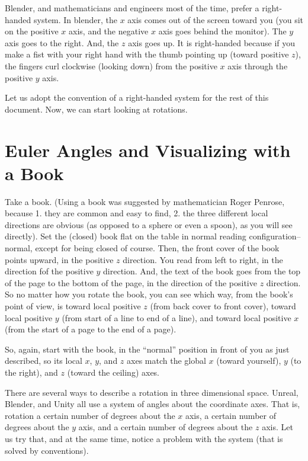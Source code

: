 \documentclass[letter,12pt]{article}
\begin{document}
Blender, and mathematicians and engineers most of the time, prefer a right-handed system.  In blender, the $x$ axis comes out of the screen toward you (you sit on the positive $x$ axis, and the negative $x$ axis goes behind the monitor).  The $y$ axis goes to the right.  And, the $z$ axis goes up.  It is right-handed because if you make a fist with your right hand with the thumb pointing up (toward positive $z$), the fingers curl clockwise (looking down) from the positive $x$ axis through the positive $y$ axis.

Let us adopt the convention of a right-handed system for the rest of this document.  Now, we can start looking at rotations.

\section{Euler Angles and Visualizing with a Book}

Take a book.  (Using a book was suggested by mathematician Roger Penrose, because 1. they are common and easy to find, 2. the three different local directions are obvious (as opposed to a sphere or even a spoon), as you will see directly).  Set the (closed) book flat on the table in normal reading configuration--normal, except for being closed of course.  Then, the front cover of the book points upward, in the positive $z$ direction.  You read from left to right, in the direction fof the positive $y$ direction.  And, the text of the book goes from the top of the page to the bottom of the page, in the direction of the positive $z$ direction.   So no matter how you rotate the book, you can see which way, from the book’s point of view, is toward local positive $z$ (from back cover to front cover), toward local positive $y$ (from start of a line to end of a line), and toward local positive $x$ (from the start of a page to the end of a page).

So, again, start with the book, in the “normal” position in front of you as just described, so its local $x$, $y$, and $z$ axes match the global $x$ (toward yourself), $y$ (to the right), and $z$ (toward the ceiling) axes.

There are several ways  to describe a rotation in three dimensional space.  Unreal, Blender, and Unity all use a system of angles about the coordinate axes.  That is, rotation a certain number of degrees about the $x$ axis, a certain number of degrees about the $y$ axis, and a certain number of degrees about the $z$ axis.  Let us try that, and at the same time, notice a problem with the system (that is solved by conventions).
\end{document}
